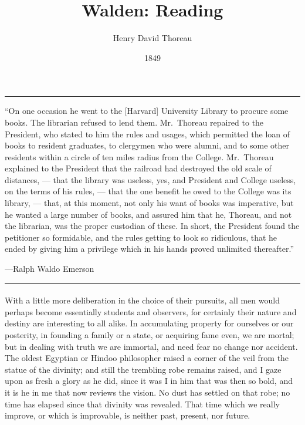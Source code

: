 \documentclass[letterpaper,12pt]{article}
\title{\vspace{-2em}Walden: Reading}
\author{Henry David Thoreau}
\date{1849}
\begin{document}
\maketitle

\hrule
\epigraph{\enquote{On one occasion he went to the [Harvard] University Library
        to procure some books.  The librarian refused to lend them.  Mr.\
        Thoreau repaired to the President, who stated to him the rules and
        usages, which permitted the loan of books to resident graduates, to
        clergymen who were alumni, and to some other residents within a circle
        of ten miles radius from the College.  Mr.\ Thoreau explained to the
        President that the railroad had destroyed the old scale of distances,
        --- that the library was useless, yes, and President and College
        useless, on the terms of his rules, --- that the one benefit he owed to
        the College was its library, --- that, at this moment, not only his want
        of books was imperative, but he wanted a large number of books, and
        assured him that he, Thoreau, and not the librarian, was the proper
        custodian of these.  In short, the President found the petitioner so
        formidable, and the rules getting to look so ridiculous, that he ended
        by giving him a privilege which in his hands proved unlimited
        thereafter.}}{---Ralph Waldo Emerson}
\hrule

\paragraph{}
With a little more deliberation in the choice of their pursuits,
all men would perhaps become essentially students and observers, for certainly
their nature and destiny are interesting to all alike.  In accumulating property
for ourselves or our posterity, in founding a family or a state, or acquiring
fame even, we are mortal; but in dealing with truth we are immortal, and need
fear no change nor accident.  The oldest Egyptian or Hindoo philosopher raised a
corner of the veil from the statue of the divinity; and still the trembling robe
remains raised, and I gaze upon as fresh a glory as he did, since it was I in
him that was then so bold, and it is he in me that now reviews the vision.  No
dust has settled on that robe; no time has elapsed since that divinity was
revealed. That time which we really improve, or which is improvable, is neither
past, present, nor future.
\end{document}

